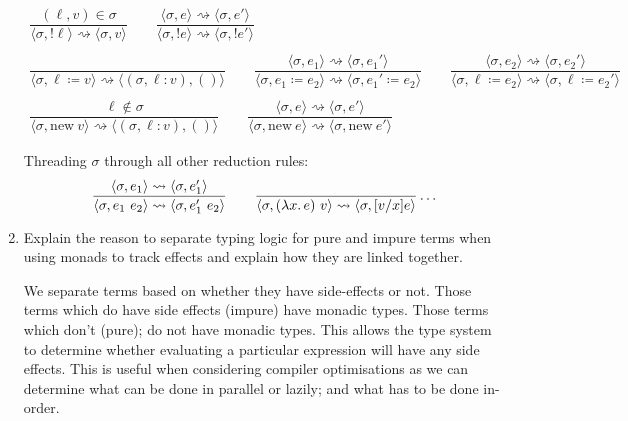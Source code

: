 \documentclass[10pt,\jkfside,a4paper]{article}
\newcommand{\abr}[2]{\ensuremath{\langle #1, #2 \rangle}}
\begin{document}
\begin{enumerate}
    \begin{gather*}
        \dfrac{
            (\ell, v) \in \sigma
        }{
            \abr{\sigma}{!\ell} \rightsquigarrow \abr{\sigma}{v}
        }
        \qquad
        \dfrac{
            \abr{\sigma}{e} \rightsquigarrow \abr{\sigma}{e'}
        }{
            \abr{\sigma}{!e} \rightsquigarrow \abr{\sigma}{!e'}
        }
        \qquad
        \\\\
        \dfrac{
        }{
            \abr{\sigma}{\ell \coloneqq v} \rightsquigarrow \abr{(\sigma, \ell: v)}{()}
        }
        \qquad
        \dfrac{
            \abr{\sigma}{e_1} \rightsquigarrow \abr{\sigma}{e_1'}
        }{
            \abr{\sigma}{e_1 \coloneqq e_2} \rightsquigarrow \abr{\sigma}{e_1' \coloneqq e_2}
        }
        \qquad
        \dfrac{
            \abr{\sigma}{e_2} \rightsquigarrow \abr{\sigma}{e_2'}
        }{
            \abr{\sigma}{\ell \coloneqq e_2} \rightsquigarrow \abr{\sigma}{\ell \coloneqq e_2'}
        }
        \\\\
        \dfrac{
            \ell \notin \sigma
        }{
            \abr{\sigma}{\mathrm{new}\ v} \rightsquigarrow \abr{(\sigma, \ell: v)}{()}
        }
        \qquad
        \dfrac{
            \abr{\sigma}{e} \rightsquigarrow \abr{\sigma}{e'}
        }{
            \abr{\sigma}{\mathrm{new}\ e} \rightsquigarrow \abr{\sigma}{\mathrm{new}\ e'}
        }
    \end{gather*}

    Threading $\sigma$ through all other reduction rules:
    \[
        \dfrac{
        \abr{\sigma}{e_1} \rightsquigarrow \abr{\sigma}{e_1'}
        }{
        \abr{\sigma}{e_1\ e_2} \rightsquigarrow \abr{\sigma}{e_1'\ e_2}
        }
        \qquad
        \dfrac{
        }{
        \abr{\sigma}{(\lambda x\ldotp e)\ v} \rightsquigarrow \abr{\sigma}{[v/x]e}
        }
        \\\\
        \ldots
    \]

    \item Explain the reason to separate typing logic for pure and impure terms when using monads to track effects and explain how they are linked together.

    We separate terms based on whether they have side-effects or not. Those terms which do have side effects (impure) have monadic types. Those terms which don't (pure); do not have monadic types. This allows
    the type system to determine whether evaluating a particular expression will have any side effects. This is useful when considering compiler optimisations as we can determine what can be done in parallel or
    lazily; and what has to be done in-order.

\end{enumerate}
\end{document}
